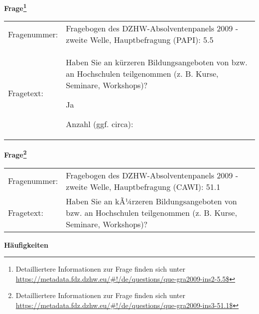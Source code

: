 				\vspace*{0.5cm}
                \noindent\textbf{Frage\footnote{Detailliertere Informationen zur Frage finden sich unter
		              \url{https://metadata.fdz.dzhw.eu/\#!/de/questions/que-gra2009-ins2-5.5$}}}\\
				\begin{tabularx}{\hsize}{@{}lX}
					Fragenummer: &
					  Fragebogen des DZHW-Absolventenpanels 2009 - zweite Welle, Hauptbefragung (PAPI):
					  5.5
 \\
					Fragetext: & Haben Sie an kürzeren Bildungsangeboten von bzw. an Hochschulen teilgenommen (z. B. Kurse, Seminare, Workshops)?\par  Ja\par  Anzahl (ggf. circa): \\
				\end{tabularx}
				\vspace*{0.5cm}
                \noindent\textbf{Frage\footnote{Detailliertere Informationen zur Frage finden sich unter
		              \url{https://metadata.fdz.dzhw.eu/\#!/de/questions/que-gra2009-ins3-51.1$}}}\\
				\begin{tabularx}{\hsize}{@{}lX}
					Fragenummer: &
					  Fragebogen des DZHW-Absolventenpanels 2009 - zweite Welle, Hauptbefragung (CAWI):
					  51.1
 \\
					Fragetext: & Haben Sie an kÃ¼rzeren Bildungsangeboten von bzw. an Hochschulen teilgenommen (z. B. Kurse, Seminare, Workshops)? \\
				\end{tabularx}





        		\vspace*{0.5cm}
                \noindent\textbf{Häufigkeiten}

